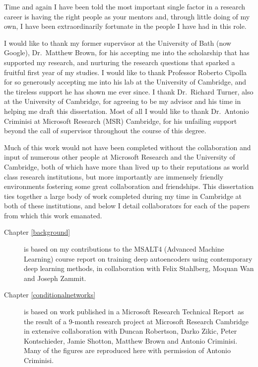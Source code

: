 
\begin{acknowledgements}      

Time and again I have been told the most important single factor in a research career is having the right people as your mentors and, through little doing of my own, I have been extraordinarily fortunate in the people I have had in this role. 

I would like to thank my former supervisor at the University of Bath (now Google), Dr.~Matthew Brown, for his accepting me into the scholarship that has supported my research, and nurturing the research questions that sparked a fruitful first year of my studies. I would like to thank Professor Roberto Cipolla for so generously accepting me into his lab at the University of Cambridge, and the tireless support he has shown me ever since. I thank Dr.~Richard Turner, also at the University of Cambridge, for agreeing to be my advisor and his time in helping me draft this dissertation. Most of all I would like to thank Dr.~Antonio Criminisi at Microsoft Research (MSR) Cambridge, for his unfailing support beyond the call of supervisor throughout the course of this degree.

Much of this work would not have been completed without the collaboration and input of numerous other people at Microsoft Research and the University of Cambridge, both of which have more than lived up to their reputations as world class research institutions, but more importantly are immensely friendly environments fostering some great collaboration and friendships. This dissertation ties together a large body of work completed during my time in Cambridge at both of these institutions, and below I detail collaborators for each of the papers from which this work emanated.

\begin{description}
	\item[Chapter \ref{background}] is based on my contributions to the MSALT4 (Advanced Machine Learning) course report on training deep autoencoders using contemporary deep learning methods, in collaboration with Felix Stahlberg, Moquan Wan and Joseph Zammit.

	\item[Chapter \ref{conditionalnetworks}] is based on work published in a Microsoft Research Technical Report~\citep{Ioannou2015}as the result of a 9-month research project at Microsoft Research Cambridge in extensive collaboration with Duncan Robertson, Darko Zikic, Peter Kontschieder, Jamie Shotton, Matthew Brown and Antonio Criminisi. Many of the figures are reproduced here with permission of Antonio Criminisi.


\end{description}
\end{acknowledgements}
